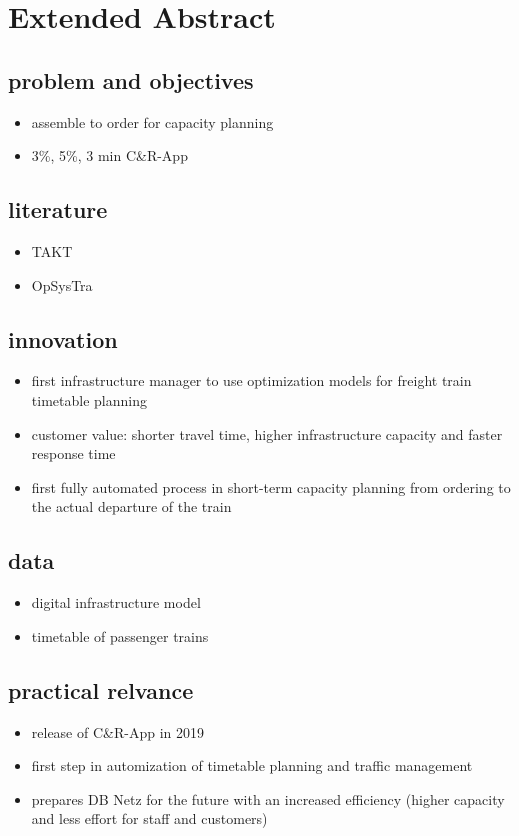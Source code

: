 \section{Extended Abstract}
\label{chap:extAbs}

\subsection{problem and objectives}
\begin{itemize}
  \item assemble to order for capacity planning
  \item 3\%, 5\%, 3 min C\&R-App
\end{itemize}

\subsection{literature}
\begin{itemize}
  \item TAKT
  \item OpSysTra
\end{itemize}

\subsection{innovation}
\begin{itemize}
  \item first infrastructure manager to use optimization models for freight train timetable planning
  \item customer value: shorter travel time, higher infrastructure capacity and faster response time
  \item first fully automated process in short-term capacity planning from ordering to the actual departure of the train
\end{itemize}

\subsection{data}
\begin{itemize}
  \item digital infrastructure model
  \item timetable of passenger trains
\end{itemize}

\subsection{practical relvance}
\begin{itemize}
  \item release of C\&R-App in 2019
  \item first step in automization of timetable planning and traffic management
  \item prepares DB Netz for the future with an increased efficiency (higher capacity and less effort for staff and customers)
\end{itemize}
